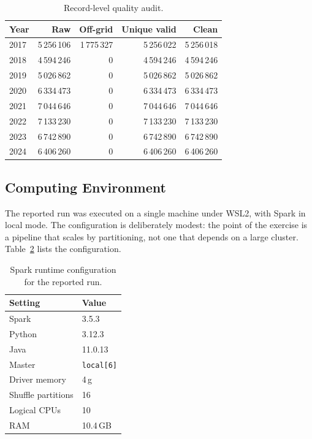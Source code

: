 \documentclass[10pt,a4paper,twocolumn,twoside]{rho-class/rho}
\begin{document}
\begin{table}[H]
\caption{Record-level quality audit.}
\label{tab:audit}
\centering
\scriptsize
\setlength{\tabcolsep}{3pt}
\begin{tabular}{lrrrr}
\toprule
\textbf{Year} & \textbf{Raw} & \textbf{Off-grid} & \textbf{Unique valid} & \textbf{Clean} \\
\midrule
2017 & 5\,256\,106 & 1\,775\,327 & 5\,256\,022 & 5\,256\,018 \\
2018 & 4\,594\,246 & 0 & 4\,594\,246 & 4\,594\,246 \\
2019 & 5\,026\,862 & 0 & 5\,026\,862 & 5\,026\,862 \\
2020 & 6\,334\,473 & 0 & 6\,334\,473 & 6\,334\,473 \\
2021 & 7\,044\,646 & 0 & 7\,044\,646 & 7\,044\,646 \\
2022 & 7\,133\,230 & 0 & 7\,133\,230 & 7\,133\,230 \\
2023 & 6\,742\,890 & 0 & 6\,742\,890 & 6\,742\,890 \\
2024 & 6\,406\,260 & 0 & 6\,406\,260 & 6\,406\,260 \\
\bottomrule
\end{tabular}
\end{table}

\subsection{Computing Environment}
The reported run was executed on a single machine under WSL2, with Spark in local mode. The configuration is deliberately modest: the point of the exercise is a pipeline that scales by partitioning, not one that depends on a large cluster. Table~\ref{tab:env} lists the configuration.

\begin{table}[H]
\caption{Spark runtime configuration for the reported run.}
\label{tab:env}
\centering
\small
\setlength{\tabcolsep}{3pt}
\begin{tabular}{ll}
\toprule
\textbf{Setting} & \textbf{Value} \\
\midrule
Spark & 3.5.3 \\
Python & 3.12.3 \\
Java & 11.0.13 \\
Master & \texttt{local[6]} \\
Driver memory & 4\,g \\
Shuffle partitions & 16 \\
Logical CPUs & 10 \\
RAM & 10.4\,GB \\
\bottomrule
\end{tabular}
\end{table}
\end{document}
